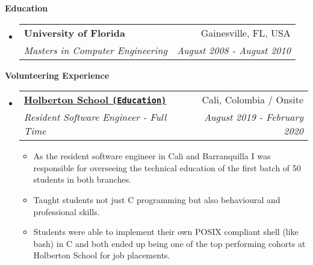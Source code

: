 \documentclass[letterpaper,11pt]{article}
\makeatletter
\newcommand{\resitem}[1]{\item #1 \vspace{-2pt}}
\newcommand{\resheading}[1]{{\large \colorbox{mygrey}{\begin{minipage}{\textwidth}{\textbf{#1 \vphantom{p\^{E}}}}\end{minipage}}}}
\newcommand{\ressubheading}[4]{
\begin{tabular*}{7.0in}{l@{\extracolsep{\fill}}r}
    \textbf{#1} & #2 \\
    \textit{#3} & \textit{#4} \\
\end{tabular*}\vspace{-6pt}}
\makeatother
\begin{document}
\vspace{0.2in}
  
\resheading{Education}
\begin{itemize}
\item
    \ressubheading{University of Florida}{Gainesville, FL, USA}{{Masters in Computer Engineering}}{August 2008 - August 2010}
    \end{itemize}


\vspace{0.2in}

\resheading{Volunteering Experience}
\begin{itemize}

\item
    \ressubheading{\href{https://www.holbertonschool.com/}{Holberton School \texttt{(Education)}}}{Cali, Colombia / Onsite}{Resident Software Engineer - Full Time}{August 2019 - February 2020}
    \begin{itemize}
        \resitem{As the resident software engineer in Cali and Barranquilla I was responsible for overseeing the technical education of the first batch of 50 students in both branches.}
        \resitem{Taught students not just C programming but also behavioural and professional skills.}
        \resitem{Students were able to implement their own POSIX compliant shell (like bash) in C and both ended up being one of the top performing cohorts at Holberton School for job placements.}
    \end{itemize}

\end{itemize}
\end{document}

